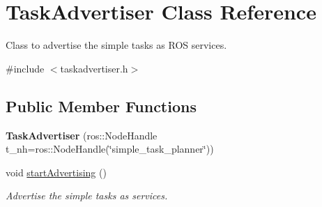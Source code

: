 \hypertarget{class_task_advertiser}{}\section{Task\+Advertiser Class Reference}
\label{class_task_advertiser}


Class to advertise the simple tasks as R\+OS services.  




{\ttfamily \#include $<$taskadvertiser.\+h$>$}

\subsection*{Public Member Functions}
\begin{DoxyCompactItemize}
\item 
{\bfseries Task\+Advertiser} (ros\+::\+Node\+Handle t\+\_\+nh=ros\+::\+Node\+Handle(\char`\"{}simple\+\_\+task\+\_\+planner\char`\"{}))\hypertarget{class_task_advertiser_ab04fae5df12efd694b51d39b8249f737}{}\label{class_task_advertiser_ab04fae5df12efd694b51d39b8249f737}

\item 
void \hyperlink{class_task_advertiser_a23ee8ef6b343f52cd7b5d7d0dcbd6fe1}{start\+Advertising} ()\hypertarget{class_task_advertiser_a23ee8ef6b343f52cd7b5d7d0dcbd6fe1}{}\label{class_task_advertiser_a23ee8ef6b343f52cd7b5d7d0dcbd6fe1}

\begin{DoxyCompactList}\small\item\em Advertise the simple tasks as services. \end{DoxyCompactList}\end{DoxyCompactItemize}
